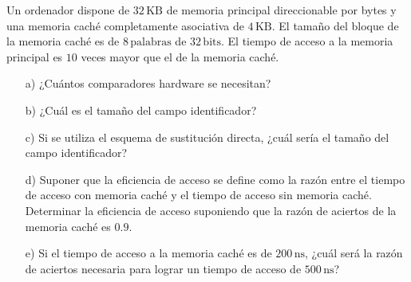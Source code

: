 \begin{ejercicio}
    Un ordenador dispone de \(32 \, \text{KB}\) de memoria principal direccionable por bytes y una memoria caché completamente asociativa de \(4 \, \text{KB}\). El tamaño del bloque de la memoria caché es de \(8 \, \text{palabras}\) de \(32 \, \text{bits}\). El tiempo de acceso a la memoria principal es \(10\) veces mayor que el de la memoria caché.
    \begin{itemize}
        \item[a)] ¿Cuántos comparadores hardware se necesitan?
        \item[b)] ¿Cuál es el tamaño del campo identificador?
        \item[c)] Si se utiliza el esquema de sustitución directa, ¿cuál sería el tamaño del campo identificador?
        \item[d)] Suponer que la eficiencia de acceso se define como la razón entre el tiempo de acceso con memoria caché y el tiempo de acceso sin memoria caché. Determinar la eficiencia de acceso suponiendo que la razón de aciertos de la memoria caché es \(0.9\).
        \item[e)] Si el tiempo de acceso a la memoria caché es de \(200 \, \text{ns}\), ¿cuál será la razón de aciertos necesaria para lograr un tiempo de acceso de \(500 \, \text{ns}\)?
    \end{itemize}
\end{ejercicio}

